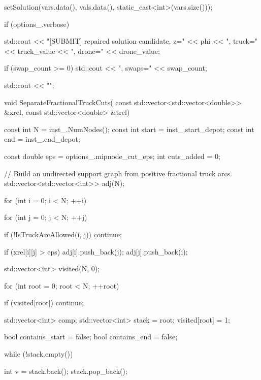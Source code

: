 {{{{                setSolution(vars.data(), vals.data(), static_cast<int>(vars.size()));

                if (options_.verbose)
                {
                    std::cout << "[SUBMIT] repaired solution candidate, z="
                              << phi
                              << ", truck=" << truck_value
                              << ", drone=" << drone_value;

                    if (swap_count >= 0)
                    {
                        std::cout << ", swaps=" << swap_count;
                    }

                    std::cout << "\n";
                }
            }

            void SeparateFractionalTruckCuts(
                const std::vector<std::vector<double>> &xrel,
                const std::vector<double> &trel)
            {
                const int N = inst_.NumNodes();
                const int start = inst_.start_depot;
                const int end = inst_.end_depot;

                const double eps = options_.mipnode_cut_eps;
                int cuts_added = 0;

                // Build an undirected support graph from positive fractional truck arcs.
                std::vector<std::vector<int>> adj(N);

                for (int i = 0; i < N; ++i)
                {
                    for (int j = 0; j < N; ++j)
                    {
                        if (!IsTruckArcAllowed(i, j))
                            continue;

                        if (xrel[i][j] > eps)
                        {
                            adj[i].push_back(j);
                            adj[j].push_back(i);
                        }
                    }
                }

                std::vector<int> visited(N, 0);

                for (int root = 0; root < N; ++root)
                {
                    if (visited[root])
                        continue;

                    std::vector<int> comp;
                    std::vector<int> stack = {root};
                    visited[root] = 1;

                    bool contains_start = false;
                    bool contains_end = false;

                    while (!stack.empty())
                    {
                        int v = stack.back();
                        stack.pop_back();

}}}}}}
